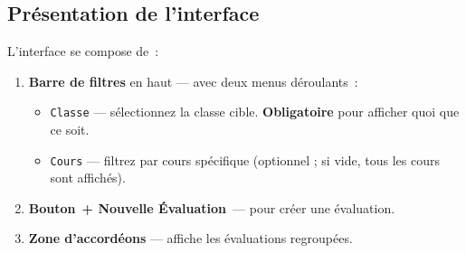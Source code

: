\documentclass[12pt,a4paper]{report}
\newcommand{\champ}[1]{\texttt{\color{violet}#1}}
\newcommand{\bouton}[1]{{\colorbox{emerald}{\small\sffamily\bfseries\color{white}\,#1\,}}}
\begin{document}
\subsection{Présentation de l'interface}

L'interface se compose de~:

\begin{enumerate}[leftmargin=1.2cm]
  \item \textbf{Barre de filtres} en haut — avec deux menus déroulants~:
  \begin{itemize}
    \item \champ{Classe} — sélectionnez la classe cible. \textbf{Obligatoire} pour afficher quoi que ce soit.
    \item \champ{Cours} — filtrez par cours spécifique (optionnel ; si vide, tous les cours sont affichés).
  \end{itemize}
  \item \textbf{Bouton} \bouton{+ Nouvelle Évaluation} — pour créer une évaluation.
  \item \textbf{Zone d'accordéons} — affiche les évaluations regroupées.
\end{enumerate}
\end{document}
